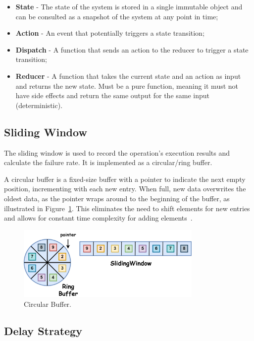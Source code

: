\begin{itemize}
    \item \textbf{State} - The state of the system is stored in a single immutable object and can be consulted as a snapshot of the system at any point in time;
    \item \textbf{Action} - An event that potentially triggers a state transition;
    \item \textbf{Dispatch} - A function that sends an action to the reducer to trigger a state transition;
    \item \textbf{Reducer} - A function that takes the current state and an action as input and returns the new state.
    Must be a pure function, meaning it must not have side effects and return the same output for the same input (deterministic).
\end{itemize}

\subsection{Sliding Window}\label{subsec:cbreaker-sliding-window}

The sliding window is used to record the operation's execution results and calculate the failure rate.
It is implemented as a circular/ring buffer.

A circular buffer is a fixed-size buffer with a pointer to indicate the next empty position, incrementing with each new entry.
When full, new data overwrites the oldest data, as the pointer wraps around to the beginning of the buffer, as illustrated in Figure~\ref{fig:05_circular-buffer}.
This eliminates the need to shift elements for new entries and allows for constant time complexity for adding elements~\cite{circular-buffer}.

\begin{figure}[!htb]
    \centering
    \includegraphics[width=0.8\textwidth]{../figures/05_circular-buffer}
    \caption{Circular Buffer.}
    \label{fig:05_circular-buffer}
\end{figure}

\subsection{Delay Strategy}\label{subsec:cbreaker-delay-strategy}

